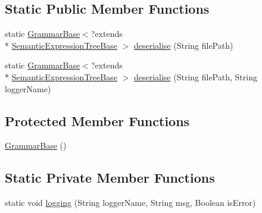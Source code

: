 \subsection*{Static Public Member Functions}
\begin{DoxyCompactItemize}
\item 
static \hyperlink{classit_1_1emarolab_1_1cagg_1_1core_1_1evaluation_1_1semanticGrammar_1_1syntaxCompiler_1_1Grammac6e795d7438edf939adda9d5323937f2_a691a0edd4327ad63248992daf16debb2}{Grammar\-Base}$<$?extends \\*
\hyperlink{interfaceit_1_1emarolab_1_1cagg_1_1core_1_1evaluation_1_1semanticGrammar_1_1syntaxCompiler_1_1SemanticExpressionTreeBase}{Semantic\-Expression\-Tree\-Base} $>$ \hyperlink{classit_1_1emarolab_1_1cagg_1_1core_1_1evaluation_1_1semanticGrammar_1_1syntaxCompiler_1_1Grammac6e795d7438edf939adda9d5323937f2_a3e160eaed7837e9e6b20761c5c264177}{deserialise} (String file\-Path)
\item 
static \hyperlink{classit_1_1emarolab_1_1cagg_1_1core_1_1evaluation_1_1semanticGrammar_1_1syntaxCompiler_1_1Grammac6e795d7438edf939adda9d5323937f2_a691a0edd4327ad63248992daf16debb2}{Grammar\-Base}$<$?extends \\*
\hyperlink{interfaceit_1_1emarolab_1_1cagg_1_1core_1_1evaluation_1_1semanticGrammar_1_1syntaxCompiler_1_1SemanticExpressionTreeBase}{Semantic\-Expression\-Tree\-Base} $>$ \hyperlink{classit_1_1emarolab_1_1cagg_1_1core_1_1evaluation_1_1semanticGrammar_1_1syntaxCompiler_1_1Grammac6e795d7438edf939adda9d5323937f2_aa2680fa7ca2d6dfef4b9732a70abc804}{deserialise} (String file\-Path, String logger\-Name)
\end{DoxyCompactItemize}
\subsection*{Protected Member Functions}
\begin{DoxyCompactItemize}
\item 
\hyperlink{classit_1_1emarolab_1_1cagg_1_1core_1_1evaluation_1_1semanticGrammar_1_1syntaxCompiler_1_1Grammac6e795d7438edf939adda9d5323937f2_a691a0edd4327ad63248992daf16debb2}{Grammar\-Base} ()
\end{DoxyCompactItemize}
\subsection*{Static Private Member Functions}
\begin{DoxyCompactItemize}
\item 
static void \hyperlink{classit_1_1emarolab_1_1cagg_1_1core_1_1evaluation_1_1semanticGrammar_1_1syntaxCompiler_1_1Grammac6e795d7438edf939adda9d5323937f2_a19b7f12c24f67abe48819fa0d868403c}{logging} (String logger\-Name, String msg, Boolean is\-Error)
\end{DoxyCompactItemize}

